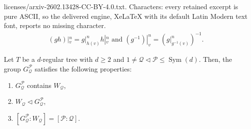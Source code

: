 \documentclass[10pt,a4paper]{amsart}
\DeclareMathOperator{\Sym}{Sym}
\begin{document}
licenses/arxiv-2602.13428-CC-BY-4.0.txt. Characters: every retained excerpt is pure ASCII, so the delivered engine, XeLaTeX with its default Latin Modern text font, reports no missing character.
\begin{align}
(gh)|_v^n = g|_{h(v)}^n h|_v^n \text{ and } (g^{-1})|_v^n = (g|_{g^{-1}(v)}^n)^{-1}.
\label{equation: properties sections}
\end{align}

\begin{Lemma}
Let $T$ be a $d$-regular tree with $d \geq 2$ and $1 \neq \mathcal{Q} \lhd \mathcal{P} \leq \Sym(d)$. Then, the group $G_\mathcal{Q}^\mathcal{P}$ satisfies the following properties:
\begin{enumerate}
\item $G_\mathcal{Q}^\mathcal{P}$ contains $W_\mathcal{Q}$,
\item $W_\mathcal{Q} \lhd G_\mathcal{Q}^\mathcal{P}$,
\item $[G_\mathcal{Q}^\mathcal{P} : W_\mathcal{Q}] = [\mathcal{P}: \mathcal{Q}]$.
\end{enumerate}
\label{lemma: GQP group and index}
\end{Lemma}
\end{document}
